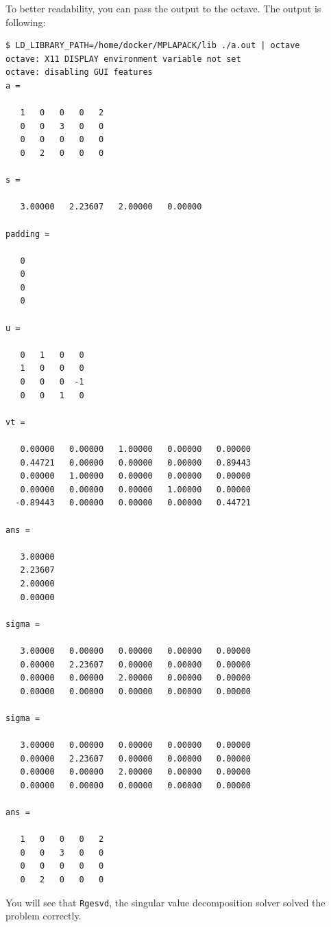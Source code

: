 \documentclass[12pt]{article}
\begin{document}
To better readability, you can pass the output to the octave. The output is following:
{\footnotesize
\begin{verbatim}
$ LD_LIBRARY_PATH=/home/docker/MPLAPACK/lib ./a.out | octave
octave: X11 DISPLAY environment variable not set
octave: disabling GUI features
a =

   1   0   0   0   2
   0   0   3   0   0
   0   0   0   0   0
   0   2   0   0   0

s =

   3.00000   2.23607   2.00000   0.00000

padding =

   0
   0
   0
   0

u =

   0   1   0   0
   1   0   0   0
   0   0   0  -1
   0   0   1   0

vt =

   0.00000   0.00000   1.00000   0.00000   0.00000
   0.44721   0.00000   0.00000   0.00000   0.89443
   0.00000   1.00000   0.00000   0.00000   0.00000
   0.00000   0.00000   0.00000   1.00000   0.00000
  -0.89443   0.00000   0.00000   0.00000   0.44721

ans =

   3.00000
   2.23607
   2.00000
   0.00000

sigma =

   3.00000   0.00000   0.00000   0.00000   0.00000
   0.00000   2.23607   0.00000   0.00000   0.00000
   0.00000   0.00000   2.00000   0.00000   0.00000
   0.00000   0.00000   0.00000   0.00000   0.00000

sigma =

   3.00000   0.00000   0.00000   0.00000   0.00000
   0.00000   2.23607   0.00000   0.00000   0.00000
   0.00000   0.00000   2.00000   0.00000   0.00000
   0.00000   0.00000   0.00000   0.00000   0.00000

ans =

   1   0   0   0   2
   0   0   3   0   0
   0   0   0   0   0
   0   2   0   0   0
\end{verbatim}
}
You will see that {\tt Rgesvd}, the singular value decomposition solver solved the problem correctly.
\end{document}
